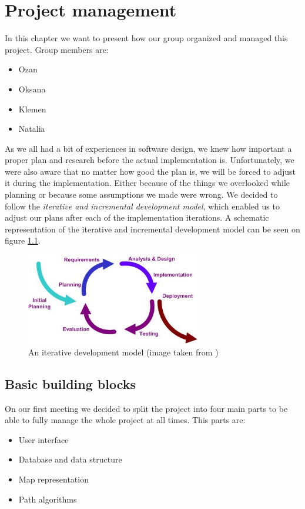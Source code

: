 
\chapter{Project management} %

\label{Chapter2} %


In this chapter we want to present how our group organized and managed this project. Group members are:
\begin{itemize}
\item Ozan
\item Oksana
\item Klemen
\item Natalia
\end{itemize}
As we all had a bit of experiences in software design, we knew how important a proper plan and research before the actual implementation is. Unfortunately, we were also aware that no matter how good the plan is, we will be forced to adjust it during the implementation. Either because of the things we overlooked while planning or because some assumptions we made were wrong. We decided to follow the \textit{iterative and incremental development model}, which enabled us to adjust our plans after each of the implementation iterations. A schematic representation of the iterative and incremental development model can be seen on figure \ref{fig:Iterative_development_model_V2}.
\begin{figure}[h]
\centering
\includegraphics[height=4cm]{../pictures/Iterative_development_model_V2}
\caption{An iterative development model (image taken from \cite{wiki1})}
\label{fig:Iterative_development_model_V2}
\end{figure}

\section{Basic building blocks}
\label{Building blocks}
On our first meeting we decided to split the project into four main parts to be able to fully manage the whole project at all times. This parts are:
\begin{itemize}
\item User interface
\item Database and data structure
\item Map representation
\item Path algorithms
\end{itemize}

